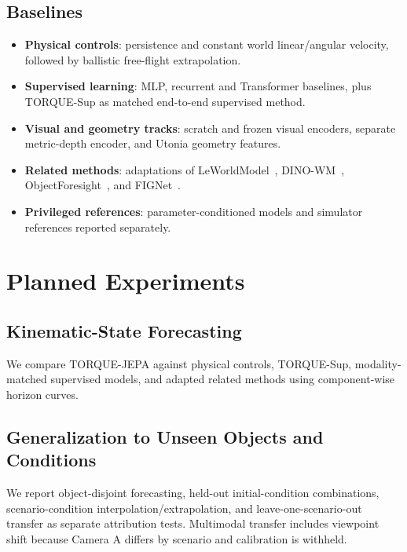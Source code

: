\documentclass{article}
\begin{document}
\subsection{Baselines}

\begin{itemize}
    \item \textbf{Physical controls}: persistence and constant world linear/angular velocity, followed by ballistic free-flight extrapolation.
    \item \textbf{Supervised learning}: MLP, recurrent and Transformer baselines, plus TORQUE-Sup as matched end-to-end supervised method.
    \item \textbf{Visual and geometry tracks}: scratch and frozen visual encoders, separate metric-depth encoder, and Utonia geometry features.
    \item \textbf{Related methods}: adaptations of LeWorldModel~\cite{maes_leworldmodel_2026}, DINO-WM~\cite{zhou_dinowm_2025}, ObjectForesight~\cite{soraki_objectforesight_2026}, and FIGNet~\cite{allen_fignet_2022}.
    \item \textbf{Privileged references}: parameter-conditioned models and simulator references reported separately.
\end{itemize}

\section{Planned Experiments}

\subsection{Kinematic-State Forecasting}

We compare TORQUE-JEPA against physical controls, TORQUE-Sup, modality-matched supervised models, and adapted related methods using component-wise horizon curves.

\subsection{Generalization to Unseen Objects and Conditions}

We report object-disjoint forecasting, held-out initial-condition combinations, scenario-condition interpolation/extrapolation, and leave-one-scenario-out transfer as separate attribution tests. Multimodal transfer includes viewpoint shift because Camera A differs by scenario and calibration is withheld.
\end{document}
